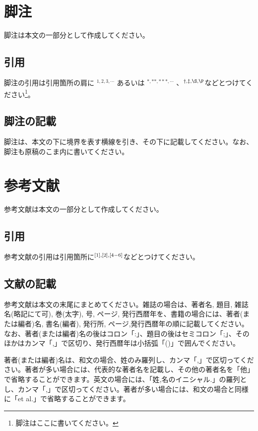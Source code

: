 \documentclass{hissymp}
\begin{document}
\section{脚注}
脚注は本文の一部分として作成してください。

\subsection{引用}
脚注の引用は引用箇所の肩に $^ {1,2,3, \cdots} $ あるいは $^ {*,**,***,\cdots} $ 、$^ {\dag, \ddag, \S, \P} $などとつけてください\footnote{脚注はここに書いてください。}。

\subsection{脚注の記載}
脚注は、本文の下に境界を表す横線を引き、その下に記載してください。なお、脚注も原稿のこま内に書いてください。


\section{参考文献}
参考文献は本文の一部分として作成してください。

\subsection{引用}
参考文献の引用は引用箇所に$^ {\scriptsize [1],[2],[4-6]} $などとつけてください。

\subsection{文献の記載}
参考文献は本文の末尾にまとめてください。雑誌の場合は、著者名, 題目, 雑誌名(略記にて可), 巻(太字), 号, ページ, 発行西暦年を、書籍の場合には、著者(または編者)名, 書名(編者), 発行所, ページ,発行西暦年の順に記載してください。なお、著者(または編者)名の後はコロン「:」、題目の後はセミコロン「;」、そのほかはカンマ「,」で区切り、発行西暦年は小括弧「()」で囲んでください。

著者(または編者)名は、和文の場合、姓のみ羅列し、カンマ「,」で区切ってください。著者が多い場合には、代表的な著者名を記載し、その他の著者名を「他」で省略することができます。英文の場合には、「姓,名のイニシャル.」の羅列とし、カンマ「,」で区切ってください。著者が多い場合には、和文の場合と同様に「et al.」で省略することができます。\\
\end{document}
